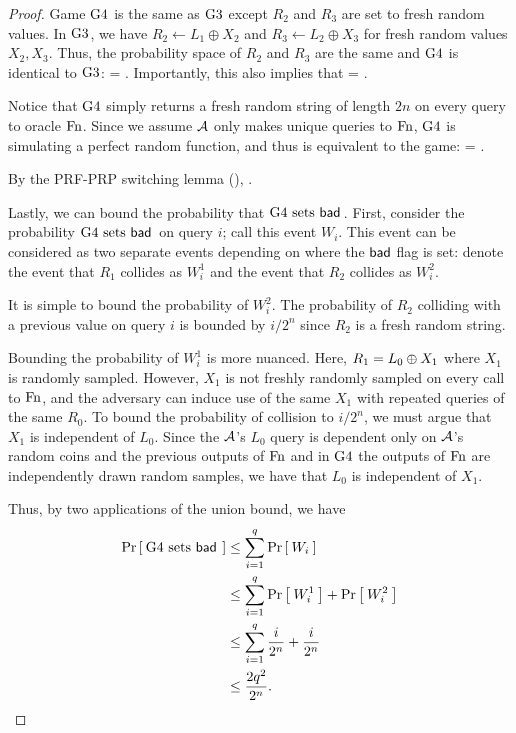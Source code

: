 \begin{proof}
Game ${{\textnormal G}}4$ is the same as ${{\textnormal G}}3$ except $R_2$ and $R_3$ are set to fresh random values.
In ${{\textnormal G}}3$, we have $R_2\gets L_1\oplus X_2$ and $R_3\gets L_2\oplus X_3$ for fresh random values $X_2,X_3$.
Thus, the probability space of $R_2$ and $R_3$ are the same and ${{\textnormal G}}4$ is identical to ${{\textnormal G}}3$:
\bnm
{} = .
\enm
Importantly, this also implies that
\bnm
{} = .
\enm

Notice that ${{\textnormal G}}4$ simply returns a fresh random string of length $2n$ on every query to oracle $\textnormal{Fn}$.
Since we assume ${\mathcal A}$ only makes unique queries to $\textnormal{Fn}$, ${{\textnormal G}}4$ is simulating a perfect random function, and thus is equivalent to the  game:
\bnm
{} = .
\enm

By the PRF-PRP switching lemma (),
	\bnm
	 \le {}  \;.
	\enm

Lastly, we can bound the probability that ${{\textnormal G}}4\mbox{~\textup{sets} $\mathsf{bad}$}\,$.
First, consider the probability ${{\textnormal G}}4\mbox{~\textup{sets} $\mathsf{bad}$}\,$ on query $i$; call this event $W_i$.
This event can be considered as two separate events depending on where the $\mathsf{bad}$ flag is set:
denote the event that $R_1$ collides as $W_i^1$ and the event that $R_2$ collides as $W_i^2$.

It is simple to bound the probability of $W_i^2$.
The probability of $R_2$ colliding with a previous value on query $i$ is bounded by $i/2^n$ since $R_2$ is a fresh random string.

Bounding the probability of $W_i^1$ is more nuanced.
Here, $R_1 = L_0{\:\oplus\:} X_1$ where $X_1$ is randomly sampled.
However, $X_1$ is not freshly randomly sampled on every call to $\textnormal{Fn}$, and the adversary can induce use of the same $X_1$ with repeated queries of the same $R_0$.
To bound the probability of collision to $i/2^n$, we must argue that $X_1$ is independent of $L_0$.
Since the ${\mathcal A}$'s $L_0$ query is dependent only on ${\mathcal A}$'s random coins and the previous outputs of $\textnormal{Fn}$ and in ${{\textnormal G}}4$ the outputs of $\textnormal{Fn}$ are independently drawn random samples, we have that $L_0$ is independent of $X_1$.

Thus, by two applications of the union bound, we have
\begin{align*}
  \Pr\left[\: {{\textnormal G}}4 \mbox{~\textup{sets} $\mathsf{bad}$}\, \:\right] &\le \sum_{i=1}^q \Pr\left[\: W_i \:\right]\\
  &\le \sum_{i=1}^q \Pr\left[\: W_i^1 \:\right] + \Pr\left[\: W_i^2 \:\right]\\
  &\le \sum_{i=1}^q \frac{i}{2^n} + \frac{i}{2^n}\\
  &\le \frac{2q^2}{2^n}.
\end{align*}


\end{proof}
